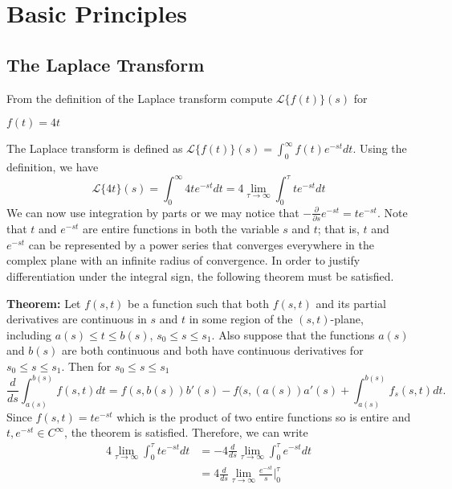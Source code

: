 \chapter{Basic Principles}

\section{The Laplace Transform}

\begin{exercise}
\item
  From the definition of the Laplace transform compute
  \(\mathcal{L}\{f(t)\}(s)\)
  for
  \begin{exercise}[label = (\alph*), ref = \arabic{exercisei} (\alph*)]
  \item
    \(f(t) = 4t\)
    \par\smallskip
    The Laplace transform is defined as
    \(\mathcal{L}\{f(t)\}(s) = \int_0^{\infty}f(t)e^{-st}dt\).
    Using the definition, we have
    \[
  \mathcal{L}\{4t\}(s) = \int_0^{\infty}4te^{-st}dt =
  4\lim_{\tau\to\infty}\int_0^{\tau}te^{-st}dt
\]
We can now use integration by parts or we may notice that
\(-\frac{\partial}{\partial s}e^{-st} = te^{-st}\).
Note that \(t\) and \(e^{-st}\) are entire functions in both the variable
\(s\) and \(t\); that is, \(t\) and \(e^{-st}\) can be represented by a
power series that converges everywhere in the complex plane with an
infinite radius of convergence.
In order to justify differentiation under the integral sign, the following
theorem must be satisfied.
\par\smallskip
\textbf{Theorem:} Let \(f(s,t)\) be a function such that both \(f(s,t)\)
and its partial derivatives are continuous in \(s\) and \(t\) in some
region of the \((s,t)\)-plane, including \(a(s)\leq t\leq b(s)\),
\(s_0\leq s\leq s_1\).
Also suppose that the functions \(a(s)\) and \(b(s)\) are both continuous
and both have continuous derivatives for \(s_0\leq s\leq s_1\).
Then for \(s_0\leq s\leq s_1\)
\[
  \frac{d}{ds}\int_{a(s)}^{b(s)}f(s, t)dt = f(s, b(s))b'(s) - f(s,(a(s))a'(s)
  + \int_{a(s)}^{b(s)}f_s(s, t)dt.
\]
Since \(f(s,t) = te^{-st}\) which is the product of two entire functions
so is entire and \(t,e^{-st}\in C^{\infty}\), the theorem is satisfied.
Therefore, we can write
\begin{align*}
  4\lim_{\tau\to\infty}\int_0^{\tau}te^{-st}dt
  & = -4\frac{d}{ds}\lim_{\tau\to\infty}\int_0^{\tau}e^{-st}dt\\
  & = 4\frac{d}{ds}\lim_{\tau\to\infty}\frac{e^{-st}}{s}\Bigr|_0^{\tau}\\

\end{align*}
\end{exercise}
\end{exercise}
